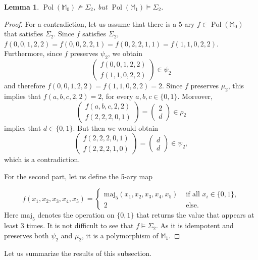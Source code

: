 \documentclass[12pt]{amsart}
\newtheorem{lemma}[theorem]{Lemma}
\theoremstyle{definition}
\theoremstyle{definition}
\DeclareMathOperator{\Pol}{Pol}
\begin{document}
\begin{lemma}\label{lem:separationSDM0andSDM1}
$\Pol(\mathbb M_0) \not\models \Sigma_2$, but $\Pol(\mathbb M_1) \models \Sigma_2$.
\end{lemma}
\begin{proof}
    For a contradiction, let us assume that there is a 5-ary $f\in\Pol(\mathbb M_0)$ that satisfies $\Sigma_2$. Since $f$ satisfies $\Sigma_2$, $f(0,0,1,2,2) = f(0,0,2,2,1) = f(0,2,2,1,1) = f(1,1,0,2,2)$. Furthermore, since $f$ preserves $\psi_2$, we obtain
    \[\begin{pmatrix}
    f(0,0,1,2,2)
    \\f(1,1,0,2,2)
    \end{pmatrix}\in\psi_2
    \] 
   and therefore $f(0,0,1,2,2)=f(1,1,0,2,2)=2$. Since $f$ preserves $\mu_2$, this implies that $f(a,b,c,2,2)=2$, for every $a,b,c\in\{0,1\}$. Moreover,
    \[\begin{pmatrix}
    f(a,b,c,2,2)
    \\f(2,2,2,0,1)
    \end{pmatrix}=\begin{pmatrix}
    2\\d
    \end{pmatrix}\in\rho_2
    \]
    implies that $d\in\{0,1\}$. But then we would obtain
    \[\begin{pmatrix}
    f(2,2,2,0,1)
    \\f(2,2,2,1,0)
    \end{pmatrix}=\begin{pmatrix}
    d\\d
    \end{pmatrix}\in\psi_2,
    \]
which is a contradiction.

For the second part, let us define the 5-ary map 

$$f(x_1,x_2,x_3,x_4,x_5) = \begin{cases}
\mathrm{maj}_5(x_1,x_2,x_3,x_4,x_5) &\text{ if all } x_i \in \{0,1\},\\
 2 &\text { else.}
\end{cases}$$
Here $\mathrm{maj}_5$ denotes the operation on $\{0,1\}$ that returns the value that appears at least 3 times. It is not difficult to see that $f \models \Sigma_2$. As it is idempotent and preserves both $\psi_2$ and $\mu_2$, it is a polymorphism of $\mathbb M_1$.
\end{proof}


Let us summarize the results of this subsection.
\end{document}
